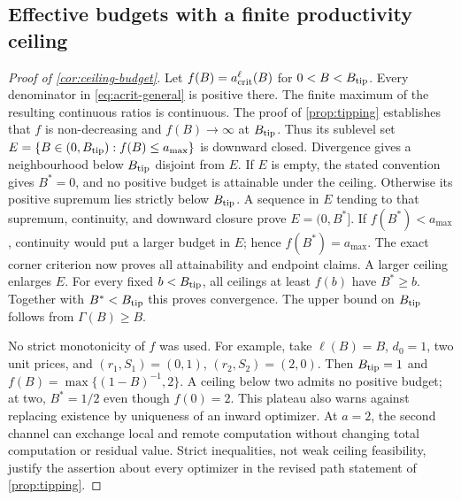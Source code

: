 \documentclass[11pt,a4paper]{article}
\theoremstyle{definition}\newtheorem{definition}{Definition}
\begin{document}
\subsection{Effective budgets with a finite productivity ceiling}
\label{app:ceiling-budget-proof}
\begin{proof}[Proof of \cref{cor:ceiling-budget}]
Let $f(B)=a_{\rm crit}^{\ell}(B)$ for $0<B<B_{\rm tip}$.
Every denominator in \cref{eq:acrit-general} is positive there.
The finite maximum of the resulting continuous ratios is continuous.
The proof of \cref{prop:tipping} establishes that $f$ is non-decreasing
and $f(B)\to\infty$ at $B_{\rm tip}$. Thus its sublevel set
$E=\{B\in(0,B_{\rm tip}):f(B)\leq a_{\max}\}$ is downward closed.
Divergence gives a neighbourhood below $B_{\rm tip}$ disjoint from $E$.
If $E$ is empty, the stated convention gives $B^*=0$, and no positive
budget is attainable under the ceiling. Otherwise its positive supremum
lies strictly below $B_{\rm tip}$. A sequence in $E$ tending to that
supremum, continuity, and downward closure prove $E=(0,B^*]$.
If $f(B^*)<a_{\max}$, continuity would put a larger budget in $E$;
hence $f(B^*)=a_{\max}$. The exact corner criterion now proves all
attainability and endpoint claims. A larger ceiling enlarges $E$.
For every fixed $b<B_{\rm tip}$, all ceilings at least $f(b)$ have
$B^*\geq b$. Together with $B^*<B_{\rm tip}$ this proves convergence.
The upper bound on $B_{\rm tip}$ follows from $\Gamma(B)\geq B$.

No strict monotonicity of $f$ was used. For example, take $\ell(B)=B$,
$d_0=1$, two unit prices, and $(r_1,S_1)=(0,1)$,
$(r_2,S_2)=(2,0)$. Then $B_{\rm tip}=1$ and
$f(B)=\max\{(1-B)^{-1},2\}$. A ceiling below two admits no positive
budget; at two, $B^*=1/2$ even though $f(0)=2$. This plateau also
warns against replacing existence by uniqueness of an inward optimizer.
At $a=2$, the second channel can exchange local and remote computation
without changing total computation or residual value. Strict inequalities,
not weak ceiling feasibility, justify the assertion about every optimizer
in the revised path statement of \cref{prop:tipping}.
\end{proof}
\end{document}
